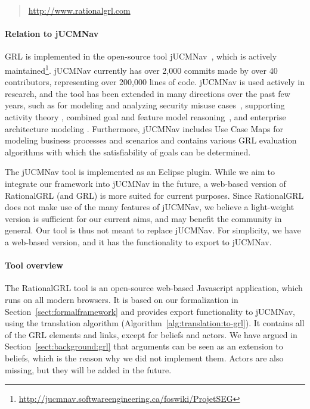 \begin{quote}
\url{http://www.rationalgrl.com}
\end{quote}

\paragraph{Relation to jUCMNav} 

GRL is implemented in the open-source tool jUCMNav~\cite{jUCMNav}, which is actively maintained\footnote{\url{http://jucmnav.softwareengineering.ca/foswiki/ProjetSEG}}. jUCMNav currently has over 2,000 commits made by over 40 contributors, representing over 200,000 lines of code. jUCMNav is used actively in research, and the tool has been extended in many directions over the past few years, such as for modeling and analyzing security misuse cases~\cite{daramola2012ontology}, supporting activity theory \cite{georg2015synergy}, combined goal and feature model reasoning~\cite{liu2014combined}, and enterprise architecture modeling \cite{marosin-etal:caise2016}. Furthermore, jUCMNav includes Use Case Maps for modeling business processes and scenarios and contains various GRL evaluation algorithms with which the satisfiability of goals can be determined. 

The jUCMNav tool is implemented as an Eclipse plugin. While we aim to integrate our framework into jUCMNav in the future, a web-based version of RationalGRL (and GRL) is more suited for current purposes. Since RationalGRL does not make use of the many features of jUCMNav, we believe a light-weight version is sufficient for our current aims, and may benefit the community in general. Our tool is thus not meant to replace jUCMNav. For simplicity, we have a web-based version, and it has the functionality to export to jUCMNav.

\paragraph{Tool overview} The RationalGRL tool is an open-source web-based Javascript application, which runs on all modern browsers. It is based on our formalization in Section~\ref{sect:formalframework} and provides export functionality to jUCMNav, using the translation algorithm (Algorithm~\ref{alg:translation:to-grl}). It contains all of the GRL elements and links, except for beliefs and actors. We have argued in Section~\ref{sect:background:grl} that arguments can be seen as an extension to beliefs, which is the reason why we did not implement them. Actors are also missing, but they will be added in the future.

